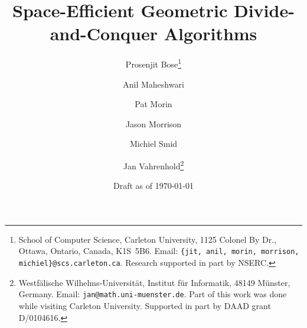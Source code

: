 
\title{Space-Efficient Geometric Divide-and-Conquer Algorithms}

\author{%
Prosenjit Bose\thanks{School of Computer Science, Carleton
    University, 1125 Colonel By Dr., Ottawa, Ontario, Canada, K1S~5B6.
    Email: \texttt{\{jit, anil, morin, morrison, michiel\}@scs.carleton.ca}. Research supported in part by NSERC.} 
\and Anil Maheshwari\footnotemark[1]
\and Pat Morin\footnotemark[1]
\and Jason Morrison\footnotemark[1]
\and Michiel Smid\footnotemark[1]
\and Jan
  Vahrenhold\thanks{Westf\"{a}lische Wilhelms-Universit\"{a}t,
    Institut f\"{u}r Informatik, 48149 M\"{u}nster, Germany.  Email:
    \texttt{jan@math.uni-muenster.de}. Part of this work was done
    while visiting Carleton University.  Supported in part by DAAD
    grant D/0104616.  } }

\ifdraft
\date{Draft as of \today}
\fi

